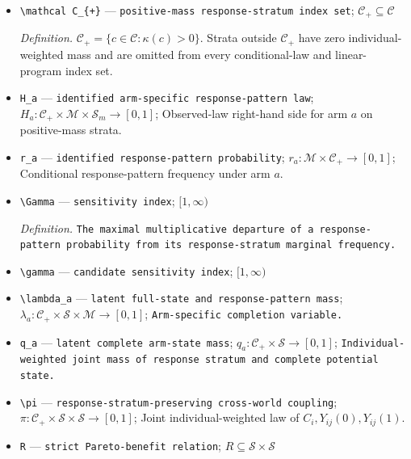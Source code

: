 \documentclass{article}
\begin{document}
\begin{itemize}
  \item \texttt{\textbackslash{}\allowbreak{}mathcal C\_\allowbreak{}\{+\allowbreak{}\}\allowbreak{}} --- \texttt{positive-\allowbreak{}mass response-\allowbreak{}stratum index set}; \(\mathcal C_{+}\subseteq\mathcal C\)
  \par\smallskip\noindent\emph{Definition.} \(\mathcal C_{+}=\{c\in\mathcal C:\kappa(c)>0\}\). Strata outside \(\mathcal C_{+}\) have zero individual-weighted mass and are omitted from every conditional-law and linear-program index set.
  \item \texttt{H\_\allowbreak{}a} --- \texttt{identified arm-\allowbreak{}specific response-\allowbreak{}pattern law}; \(H_a:\mathcal C_{+}\times\mathcal M\times\mathcal S_m\to[0,1]\); Observed-law right-hand side for arm \(a\) on positive-mass strata.
  \item \texttt{r\_\allowbreak{}a} --- \texttt{identified response-\allowbreak{}pattern probability}; \(r_a:\mathcal M\times\mathcal C_{+}\to[0,1]\); Conditional response-pattern frequency under arm \(a\).
  \item \texttt{\textbackslash{}\allowbreak{}Gamma} --- \texttt{sensitivity index}; \([1,\infty)\)
  \par\smallskip\noindent\emph{Definition.} \texttt{The maximal multiplicative departure of a response-\allowbreak{}pattern probability from its response-\allowbreak{}stratum marginal frequency.}
  \item \texttt{\textbackslash{}\allowbreak{}gamma} --- \texttt{candidate sensitivity index}; \([1,\infty)\)
  \item \texttt{\textbackslash{}\allowbreak{}lambda\_\allowbreak{}a} --- \texttt{latent full-\allowbreak{}state and response-\allowbreak{}pattern mass}; \(\lambda_a:\mathcal C_{+}\times\mathcal S\times\mathcal M\to[0,1]\); \texttt{Arm-\allowbreak{}specific completion variable.}
  \item \texttt{q\_\allowbreak{}a} --- \texttt{latent complete arm-\allowbreak{}state mass}; \(q_a:\mathcal C_{+}\times\mathcal S\to[0,1]\); \texttt{Individual-\allowbreak{}weighted joint mass of response stratum and complete potential state.}
  \item \texttt{\textbackslash{}\allowbreak{}pi} --- \texttt{response-\allowbreak{}stratum-\allowbreak{}preserving cross-\allowbreak{}world coupling}; \(\pi:\mathcal C_{+}\times\mathcal S\times\mathcal S\to[0,1]\); Joint individual-weighted law of \(C_i,Y_{ij}(0),Y_{ij}(1)\).
  \item \texttt{R} --- \texttt{strict Pareto-\allowbreak{}benefit relation}; \(R\subseteq\mathcal S\times\mathcal S\)

\end{itemize}
\end{document}
